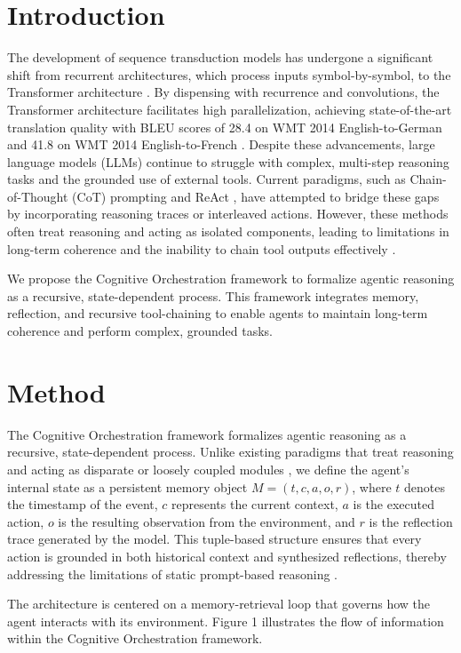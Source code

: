 \documentclass[11pt,a4paper]{article}
\begin{document}
\section{Introduction}
The development of sequence transduction models has undergone a significant shift from recurrent architectures, which process inputs symbol-by-symbol, to the Transformer architecture \cite{vaswani2017}. By dispensing with recurrence and convolutions, the Transformer architecture facilitates high parallelization, achieving state-of-the-art translation quality with BLEU scores of 28.4 on WMT 2014 English-to-German and 41.8 on WMT 2014 English-to-French \cite{vaswani2017}. Despite these advancements, large language models (LLMs) continue to struggle with complex, multi-step reasoning tasks and the grounded use of external tools. Current paradigms, such as Chain-of-Thought (CoT) prompting \cite{wei2022} and ReAct \cite{yao2023}, have attempted to bridge these gaps by incorporating reasoning traces or interleaved actions. However, these methods often treat reasoning and acting as isolated components, leading to limitations in long-term coherence and the inability to chain tool outputs effectively \cite{schick2023}.

We propose the Cognitive Orchestration framework to formalize agentic reasoning as a recursive, state-dependent process. This framework integrates memory, reflection, and recursive tool-chaining to enable agents to maintain long-term coherence and perform complex, grounded tasks.

\section{Method}
The Cognitive Orchestration framework formalizes agentic reasoning as a recursive, state-dependent process. Unlike existing paradigms that treat reasoning and acting as disparate or loosely coupled modules \cite{yao2023}, we define the agent's internal state as a persistent memory object $M = (t, c, a, o, r)$, where $t$ denotes the timestamp of the event, $c$ represents the current context, $a$ is the executed action, $o$ is the resulting observation from the environment, and $r$ is the reflection trace generated by the model. This tuple-based structure ensures that every action is grounded in both historical context and synthesized reflections, thereby addressing the limitations of static prompt-based reasoning \cite{wei2022}.

The architecture is centered on a memory-retrieval loop that governs how the agent interacts with its environment. Figure 1 illustrates the flow of information within the Cognitive Orchestration framework.
\end{document}
